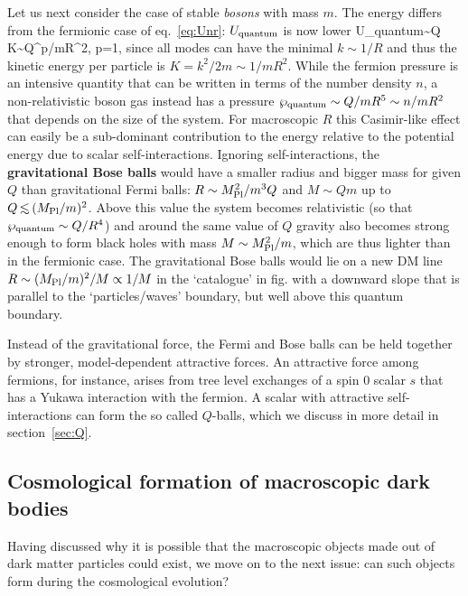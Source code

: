 \smallskip

Let us next consider the case of stable {\em bosons} with mass $m$. 
The energy differs from the fermionic case of eq.~\eqref{eq:Unr}: $U_{\rm quantum}$ is now lower
\beq
\label{eq:Uquantum:bose}
U_{\rm quantum}\sim Q K\sim  Q^p/mR^2, \qquad {}\quad p=1,
\eeq
since all modes can have the minimal $k \sim 1/R$ and thus the kinetic energy per particle is $K=k^2/2m\sim 1/m R^2$.
While the fermion pressure is an intensive quantity that can be written
in terms of the number density $n$,
a non-relativistic boson gas instead has 
a pressure $\wp_{\rm quantum}\sim Q/mR^5\sim n/mR^2$ that depends on the size of the system. 
For macroscopic  $R$ this Casimir-like effect can easily be a sub-dominant contribution to the energy relative to the potential energy due to scalar self-interactions.
Ignoring self-interactions, the {\bf gravitational Bose balls} would have a smaller radius and bigger mass for given $Q$ than gravitational Fermi balls: 
$R\sim M_{\rm Pl}^2/m^3 Q$ and  $M \sim Q m$
up to $Q\circa{<}(M_{\rm Pl}/m)^2$. 
Above this value the system becomes relativistic
(so that $\wp_{\rm quantum}\sim Q/R^4$)
and around the same value of $Q$ gravity also becomes strong enough to form black holes with mass $M\sim M_{\rm Pl}^2/m$, which are thus 
lighter than in the fermionic case.
The gravitational Bose balls would lie on a new DM line $R \sim (M_{\rm Pl}/m)^2/M \propto 1/M$ in the `catalogue' in fig.
with a downward slope that is parallel to the  `particles/waves' boundary, but well above this quantum boundary.

\smallskip

Instead of the gravitational force, the Fermi and Bose balls can be held together by stronger, model-dependent attractive forces.
An attractive force among fermions, for instance, arises from tree level exchanges of a spin 0 scalar $s$ that has a Yukawa interaction with the fermion.
A scalar with attractive self-interactions can form the so called $Q$-balls, which we discuss in more detail in section~\ref{sec:Q}.



\subsection{Cosmological formation of macroscopic dark bodies}\label{sec:Q2}
Having discussed why it is possible that the macroscopic objects made out of dark matter particles could exist, 
we move on to the next issue: can such objects form during the cosmological evolution?

